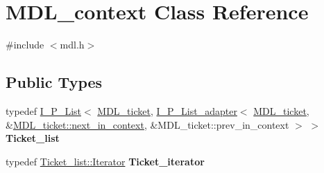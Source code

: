 \hypertarget{classMDL__context}{}\section{M\+D\+L\+\_\+context Class Reference}
\label{classMDL__context}


{\ttfamily \#include $<$mdl.\+h$>$}

\subsection*{Public Types}
\begin{DoxyCompactItemize}
\item 
\mbox{\label{classMDL__context_ab0e1989a324f4a2918656245963f23fa}} 
typedef \mbox{\hyperlink{classI__P__List}{I\+\_\+\+P\+\_\+\+List}}$<$ \mbox{\hyperlink{classMDL__ticket}{M\+D\+L\+\_\+ticket}}, \mbox{\hyperlink{structI__P__List__adapter}{I\+\_\+\+P\+\_\+\+List\+\_\+adapter}}$<$ \mbox{\hyperlink{classMDL__ticket}{M\+D\+L\+\_\+ticket}}, \&\mbox{\hyperlink{classMDL__ticket_a74155707577dfd12cc7f47229e4f0d17}{M\+D\+L\+\_\+ticket\+::next\+\_\+in\+\_\+context}}, \&M\+D\+L\+\_\+ticket\+::prev\+\_\+in\+\_\+context $>$ $>$ {\bfseries Ticket\+\_\+list}
\item 
\mbox{\label{classMDL__context_a0c46960d79806f52abbf0ba43af6ad04}} 
typedef \mbox{\hyperlink{classI__P__List__iterator}{Ticket\+\_\+list\+::\+Iterator}} {\bfseries Ticket\+\_\+iterator}
\end{DoxyCompactItemize}
